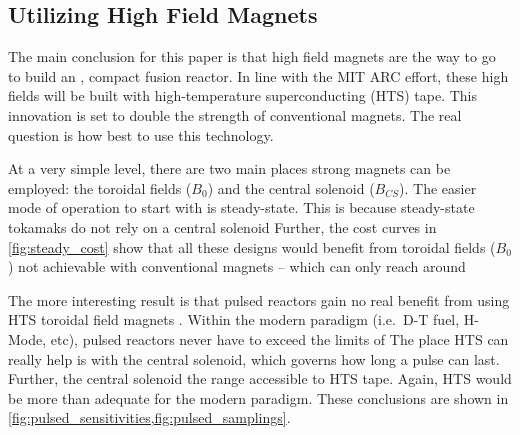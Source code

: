 \clearpage

\newpage

\subsection{Utilizing High Field Magnets}

\label{subsection:high_field}

The main conclusion for this paper is that high field magnets are the way to go to build an , compact fusion reactor. In line with the MIT ARC effort, these high fields will be built with high-temperature superconducting (HTS) tape. This innovation is set to  double the strength of conventional magnets. The real question is how best to use this technology.

At a very simple level, there are two main places strong magnets can be employed: the toroidal fields ($B_0$) and the central solenoid ($B_{CS}$). The easier mode of operation to start with is steady-state. This is because steady-state tokamaks do not rely on a central solenoid  Further, the cost curves in \cref{fig:steady_cost} show that all these designs would benefit from toroidal fields ($B_0$) not achievable with conventional magnets -- which can only reach around 

The more interesting result is that pulsed reactors gain no real benefit from using HTS toroidal field magnets . Within the modern paradigm (i.e.\ D-T fuel, H-Mode, etc), pulsed reactors never have to exceed the limits of  The place HTS can really help is with the central solenoid, which governs how long a pulse can last. Further,  the central solenoid  the range accessible to HTS tape. Again, HTS would be more than adequate for the modern paradigm. These conclusions are shown in \cref{fig:pulsed_sensitivities,fig:pulsed_samplings}.

